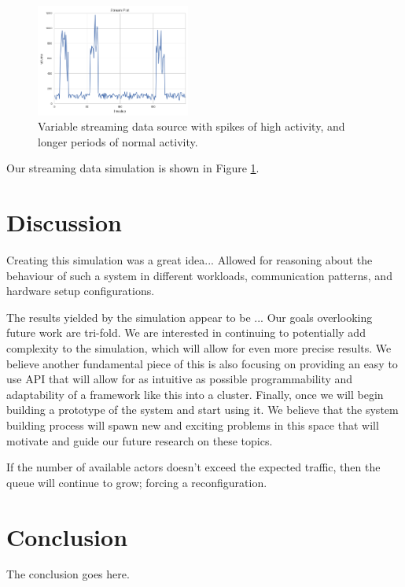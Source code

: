 \documentclass[conference,twocolumn,11pt]{IEEEtran}
\begin{document}
\begin{figure}[!h]
    \centering
    \includegraphics[width=0.45\textwidth]{streaming}
    \caption{Variable streaming data source with spikes of high activity, and longer periods of normal activity.}
    \label{fig:streaming}
\end{figure}

Our streaming data simulation is shown in Figure \ref{fig:streaming}.


\section{Discussion}

Creating this simulation was a great idea...
Allowed for reasoning about the behaviour of such a system in different workloads, communication patterns, and hardware setup configurations.

The results yielded by the simulation appear to be ...
Our goals overlooking future work are tri-fold. We are interested in continuing to potentially add complexity to the simulation, which will allow for even more precise results. We believe another fundamental piece of this is also focusing on providing an easy to use API that will allow for as intuitive as possible programmability and adaptability of a framework like this into a cluster. Finally, once we will begin building a prototype of the system and start using it.  We believe that the system building process will spawn new and exciting problems in this space that will motivate and guide our future research on these topics.

If the number of available actors doesn't exceed the expected traffic, then the queue will continue to grow; forcing a reconfiguration.

\section{Conclusion}
The conclusion goes here.
\end{document}
